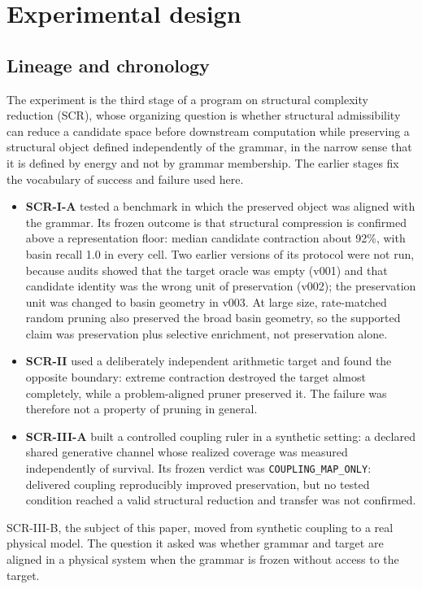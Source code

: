 \documentclass[11pt,a4paper]{article}
\theoremstyle{plain}
\theoremstyle{definition}
\theoremstyle{remark}
\newcommand{\lean}[1]{\nolinkurl{#1}}
\begin{document}
\section{Experimental design}\label{sec:design}

\subsection{Lineage and chronology}
The experiment is the third stage of a program on structural complexity reduction (SCR), whose organizing question is whether structural admissibility can reduce a candidate space before downstream computation while preserving a structural object defined independently of the grammar, in the narrow sense that it is defined by energy and not by grammar membership. The earlier stages fix the vocabulary of success and failure used here.
\begin{itemize}
\item \textbf{SCR-I-A} tested a benchmark in which the preserved object was aligned with the grammar. Its frozen outcome is that structural compression is confirmed above a representation floor: median candidate contraction about 92\%, with basin recall 1.0 in every cell. Two earlier versions of its protocol were not run, because audits showed that the target oracle was empty (v001) and that candidate identity was the wrong unit of preservation (v002); the preservation unit was changed to basin geometry in v003. At large size, rate-matched random pruning also preserved the broad basin geometry, so the supported claim was preservation plus selective enrichment, not preservation alone.
\item \textbf{SCR-II} used a deliberately independent arithmetic target and found the opposite boundary: extreme contraction destroyed the target almost completely, while a problem-aligned pruner preserved it. The failure was therefore not a property of pruning in general.
\item \textbf{SCR-III-A} built a controlled coupling ruler in a synthetic setting: a declared shared generative channel whose realized coverage was measured independently of survival. Its frozen verdict was \lean{COUPLING_MAP_ONLY}: delivered coupling reproducibly improved preservation, but no tested condition reached a valid structural reduction and transfer was not confirmed.
\end{itemize}
SCR-III-B, the subject of this paper, moved from synthetic coupling to a real physical model. The question it asked was whether grammar and target are aligned in a physical system when the grammar is frozen without access to the target.
\end{document}
